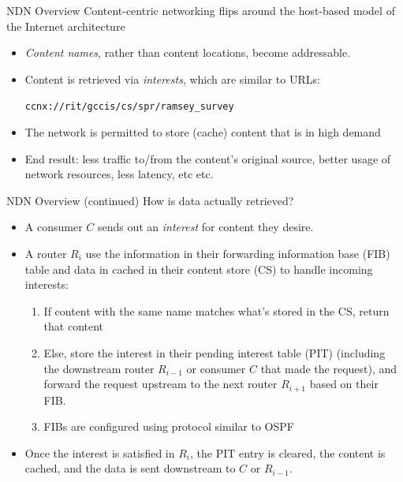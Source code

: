 \documentclass[handout]{beamer}
\begin{document}
\begin{frame}{NDN Overview}
	Content-centric networking flips around the host-based model of the Internet architecture
	\begin{itemize}
		\item \emph{Content names}, rather than content locations, become addressable. 
		\item Content is retrieved via \emph{interests}, which are similar to URLs: 
		\begin{center}
			{\tt ccnx://rit/gccis/cs/spr/ramsey\_survey}
		\end{center}
		\item The network is permitted to store (cache) content that is in high demand
		\item End result: less traffic to/from the content's original source, better usage of network resources, less latency, etc etc.
	\end{itemize}
\end{frame}

\begin{frame}{NDN Overview (continued)}
	How is data actually retrieved? 
	\begin{itemize}
		\item A consumer $C$ sends out an \emph{interest} for content they desire.
		\item A router $R_i$ use the information in their forwarding information base (FIB) table and data in cached in their content store (CS) to handle incoming interests:
		\begin{enumerate}
			\item If content with the same name matches what's stored in the CS, return that content
			\item Else, store the interest in their pending interest table (PIT) (including the downstream router $R_{i-1}$ or consumer $C$ that made the request), and forward the request upstream to the next router $R_{i+1}$ based on their FIB.
			\item FIBs are configured using protocol similar to OSPF
		\end{enumerate}
		\item Once the interest is satisfied in $R_i$, the PIT entry is cleared, the content is cached, and the data is sent downstream to $C$ or $R_{i-1}$. 
 	\end{itemize}
\end{frame}
\end{document}
